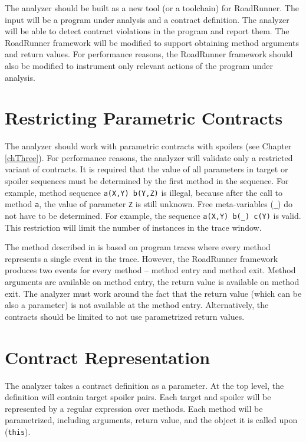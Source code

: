 
The analyzer should be built as a new tool (or a toolchain) for RoadRunner. The
input will be a program under analysis and a contract definition. The analyzer
will be able to detect contract violations in the program and report them. The
RoadRunner framework will be modified to support obtaining method arguments and
return values. For performance reasons, the RoadRunner framework should also be
modified to instrument only relevant actions of the program under analysis.

\section{Restricting Parametric Contracts}

The analyzer should work with parametric contracts with spoilers (see Chapter
\ref{chThree}). For performance reasons, the analyzer will validate only a
restricted variant of contracts. It is required that the value of all parameters
in target or spoiler sequences must be determined by the first method in the
sequence. For example, method sequence \texttt{a(X,Y) b(Y,Z)} is illegal,
because after the call to method \texttt{a}, the value of parameter \texttt{Z}
is still unknown. Free meta-variables (\texttt{\_}) do not have to be
determined. For example, the sequence \texttt{a(X,Y) b(\_) c(Y)} is valid. This
restriction will limit the number of instances in the trace window.

The method described in \cite{contracts} is based on program traces where
every method represents a single event in the trace. However, the RoadRunner
framework produces two events for every method -- method entry and method exit.
Method arguments are available on method entry, the return value is available on
method exit. The analyzer must work around the fact that the return value (which
can be also a parameter) is not available at the method entry. Alternatively,
the contracts should be limited to not use parametrized return values.

\section{Contract Representation}

The analyzer takes a contract definition as a parameter. At the top level, the
definition will contain target spoiler pairs. Each target and spoiler will be
represented by a regular expression over methods. Each method will be
parametrized, including arguments, return value, and the object it is called
upon (\texttt{this}).

